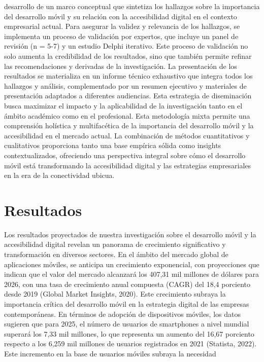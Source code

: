 \documentclass[12pt]{article}
\begin{document}
desarrollo de un marco conceptual que sintetiza los hallazgos sobre la importancia del desarrollo móvil y su relación con la accesibilidad digital en el contexto empresarial actual.
Para asegurar la validez y relevancia de los hallazgos, se implementa un proceso de validación por expertos, que incluye un panel de revisión (n = 5-7) y un estudio Delphi iterativo. Este proceso de validación no solo aumenta la credibilidad de los resultados, sino que también permite refinar las recomendaciones y derivadas de la investigación.
La presentación de los resultados se materializa en un informe técnico exhaustivo que integra todos los hallazgos y análisis, complementado por un resumen ejecutivo y materiales de presentación adaptados a diferentes audiencias. Esta estrategia de diseminación busca maximizar el impacto y la aplicabilidad de la investigación tanto en el ámbito académico como en el profesional.
Esta metodología mixta permite una comprensión holística y multifacética de la importancia del desarrollo móvil y la accesibilidad en el mercado actual. La combinación de métodos cuantitativos y cualitativos proporciona tanto una base empírica sólida como insights contextualizados, ofreciendo una perspectiva integral sobre cómo el desarrollo móvil está transformando la accesibilidad digital y las estrategias empresariales en la era de la conectividad ubicua.

\section*{Resultados}
Los resultados proyectados de nuestra investigación sobre el desarrollo móvil y la accesibilidad digital revelan un panorama de crecimiento significativo y transformación en diversos sectores. En el ámbito del mercado global de aplicaciones móviles, se anticipa un crecimiento exponencial, con proyecciones que indican que el valor del mercado alcanzará los 407,31 mil millones de dólares para 2026, con una tasa de crecimiento anual compuesta (CAGR) del 18,4 porciento desde 2019 (Global Market Insights, 2020). Este crecimiento subraya la importancia crítica del desarrollo móvil en la estrategia digital de las empresas contemporáneas.
En términos de adopción de dispositivos móviles, los datos sugieren que para 2025, el número de usuarios de smartphones a nivel mundial superará los 7,33 mil millones, lo que representa un aumento del 16,67 porciento respecto a los 6,259 mil millones de usuarios registrados en 2021 (Statista, 2022). Este incremento en la base de usuarios móviles subraya la necesidad
 
\end{document}
